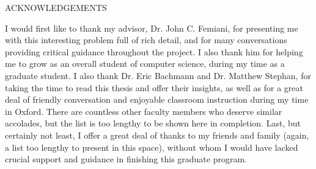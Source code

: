 \documentclass[12pt, oneside]{book2}
\def\Advisor{John C. Femiani}
\def\ReaderOne{Eric Bachmann}
\def\ReaderTwo{Matthew Stephan}
\begin{document}
\if@xetex
	\cleardoublepage
\else
	\ifpdf
		\cleardoublepage
	\else
		\cleardoublepage
	\fi
\fi

\setcounter{page}{2}
\tableofcontents
\setcounter{tocdepth}{2}
\listoffigures

\newpage

\begin{center} ACKNOWLEDGEMENTS \end{center}

\noindent I would first like to thank my advisor, Dr. \Advisor{}, for presenting me with this interesting problem full of rich detail, and for many conversations providing critical guidance throughout the project. I also thank him for helping me to grow as an overall student of computer science, during my time as a graduate student. I also thank Dr. \ReaderOne{} and Dr. \ReaderTwo{}, for taking the time to read this thesis and offer their insights, as well as for a great deal of friendly conversation and enjoyable classroom instruction during my time in Oxford. There are countless other faculty members who deserve similar accolades, but the list is too lengthy to be shown here in completion. Last, but certainly not least, I offer a great deal of thanks to my friends and family (again, a list too lengthy to present in this space), without whom I would have lacked crucial support and guidance in finishing this graduate program.

\mainmatter









% 
% 
% 
% 

\backmatter



\end{document}
